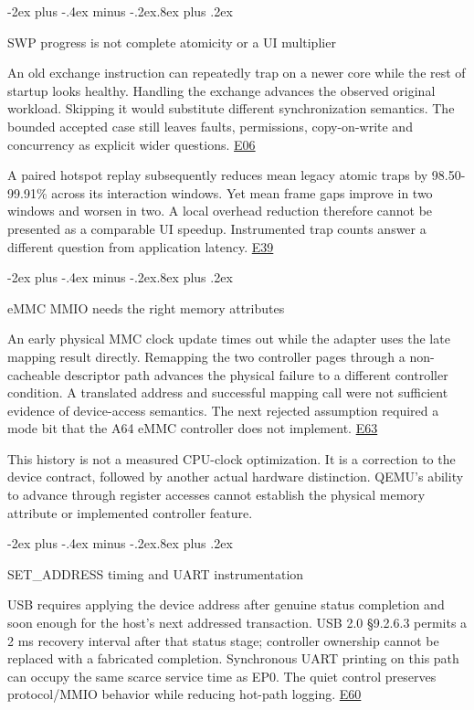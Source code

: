\documentclass[10pt,letterpaper,twocolumn]{article}
\makeatletter
\renewcommand{\subsection}{\@startsection{subsection}{2}{0pt}
  {-2ex plus -.4ex minus -.2ex}{.8ex plus .2ex}
  {\normalfont\normalsize\bfseries\raggedright}}
\makeatother
\begin{document}
\subsection{SWP progress is not complete atomicity or a UI multiplier}

An old exchange instruction can repeatedly trap on a newer core while the rest of startup looks healthy. Handling the exchange advances the observed original workload. Skipping it would substitute different synchronization semantics. The bounded accepted case still leaves faults, permissions, copy-on-write and concurrency as explicit wider questions. \hyperlink{e-E06}{\textsf{E06}}

A paired hotspot replay subsequently reduces mean legacy atomic traps by 98.50-99.91\% across its interaction windows. Yet mean frame gaps improve in two windows and worsen in two. A local overhead reduction therefore cannot be presented as a comparable UI speedup. Instrumented trap counts answer a different question from application latency. \hyperlink{e-E39}{\textsf{E39}}

\subsection{eMMC MMIO needs the right memory attributes}

An early physical MMC clock update times out while the adapter uses the late mapping result directly. Remapping the two controller pages through a non-cacheable descriptor path advances the physical failure to a different controller condition. A translated address and successful mapping call were not sufficient evidence of device-access semantics. The next rejected assumption required a mode bit that the A64 eMMC controller does not implement. \hyperlink{e-E63}{\textsf{E63}}

This history is not a measured CPU-clock optimization. It is a correction to the device contract, followed by another actual hardware distinction. QEMU's ability to advance through register accesses cannot establish the physical memory attribute or implemented controller feature.

\subsection{SET\_ADDRESS timing and UART instrumentation}

USB requires applying the device address after genuine status completion and soon enough for the host's next addressed transaction. USB 2.0 §9.2.6.3 permits a 2 ms recovery interval after that status stage; controller ownership cannot be replaced with a fabricated completion. Synchronous UART printing on this path can occupy the same scarce service time as EP0. The quiet control preserves protocol/MMIO behavior while reducing hot-path logging. \cite{ref-15} \hyperlink{e-E60}{\textsf{E60}}
\end{document}
